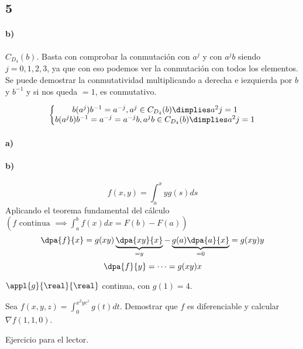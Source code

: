 \subsection{5}

\paragraph{b)}
$C_{D_4}(b)$. Basta con comprobar la conmutación con $a^j$ y con $a^jb$ siendo $j = 0,1,2,3$, ya que con eso podemos ver la conmutación con todos los elementos. Se puede demostrar la conmutatividad multiplicando a derecha e iezquierda por $b$ y $b^{-1}$ y si nos queda $=1$, es conmutativo.

$$\left\{\begin{matrix}b(a^j)b^{-1} = a^{-j}, a^j \in C_{D_4}(b) \dimplies a^2j = 1\\
b(a^jb)b^{-1} = a^{-j} = a^{-j}b, a^jb \in C_{D_4}(b) \dimplies a^2j = 1\end{matrix}\right.$$

\begin{problem}[9]
\solution
\paragraph{a)}
\paragraph{b)}

$$f(x,y) = \int_a^xy g(s)ds$$
Aplicando el teorema fundamental del cálculo $\left(f \text{ continua } \implies\displaystyle\int_a^b f(x)dx = F(b)-F(a)\right)$
$$\dpa{f}{x} = g(xy)\underbrace{\dpa{xy}{x}}_{=y} - \underbrace{g(a)\dpa{a}{x}}_{=0}  = g(xy)y$$
$$\dpa{f}{y} = \cdots  = g(xy)x$$
\end{problem}

\begin{problem}
$\appl{g}{\real}{\real}$ continua, con $g(1) = 4$.

Sea $f(x,y,z)=\displaystyle \int_0^{x^2ye^z} g(t)dt$.
Demostrar que $f$ es diferenciable y calcular $\nabla f(1,1,0)$.

\solution

Ejercicio para el lector.

\end{problem}
\newpage
